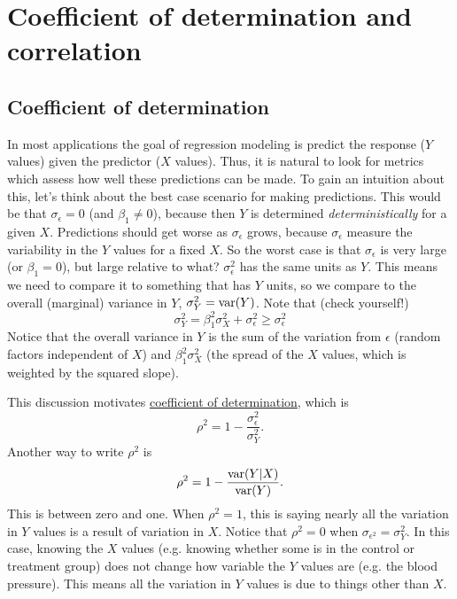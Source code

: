 \section{Coefficient of determination and correlation}
\subsection{Coefficient of determination}

In most applications the goal of regression modeling is predict  the response ($Y$ values) given the predictor ($X$ values). Thus, it is natural to look for metrics which assess how well these predictions can be made. To gain an intuition about this, let's think about the best case scenario for making predictions. This would be that $\sigma_{\epsilon}=0$ (and $\beta_1\ne0$), because then $Y$ is determined \emph{deterministically} for a given $X$. Predictions should get worse as $\sigma_{\epsilon}$ grows, because $\sigma_{\epsilon}$ measure the variability in the $Y$ values for a fixed $X$. So the worst case is that $\sigma_{\epsilon}$ is very large (or $\beta_1=0$), but large relative to what? $\sigma_{\epsilon}^2$ has the same units as $Y$. This means we need to compare it to something that has $Y$ units, so we compare to the overall (marginal) variance in $Y$, $\sigma_Y^2 = {\rm var}(Y)$. Note that (check yourself!)
\begin{equation}
\sigma_Y^2 = \beta_1^2\sigma_X^2 + \sigma_{\epsilon}^2 \ge  \sigma_{\epsilon}^2
\end{equation}
Notice that the overall variance in $Y$ is the sum of the variation from $\epsilon$ (random factors independent of $X$) and $\beta_1^2\sigma_X^2$ (the spread of the $X$ values, which is weighted by the squared slope). 

This discussion motivates \underline{coefficient of determination}, which is 
\begin{equation}
\rho^2 = 1 - \frac{\sigma_{\epsilon}^2}{\sigma_Y^2}. 
\end{equation}
Another way to write $\rho^2$ is
\begin{equation}
\rho^2 = 1 - \frac{{\rm var}(Y|X)}{{\rm var}(Y)}. 
\end{equation}
This is between zero and one. When $\rho^2=1$, this is saying nearly all the variation in $Y$ values is a result of variation in $X$. Notice that $\rho^2 = 0$ when $\sigma_{\epsilon^2} = \sigma_Y^2$. In this case, knowing the $X$ values (e.g. knowing whether some is in the control or treatment group) does not change how variable the $Y$ values are (e.g. the blood pressure). This means all the variation in $Y$ values is due to things other than $X$.  

